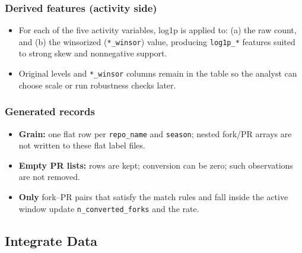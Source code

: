 \subsubsection{Derived features (activity side)}

\begin{itemize}
  \item For each of the five activity variables, log1p is applied to: (a) the raw count, and (b) the winsorized (\texttt{*\_winsor}) value, producing \texttt{log1p\_*} features suited to strong skew and nonnegative support.
  \item Original levels and \texttt{*\_winsor} columns remain in the table so the analyst can choose scale or run robustness checks later.
\end{itemize}

\subsubsection{Generated records}

\begin{itemize}
  \item \textbf{Grain:} one flat row per \texttt{repo\_name} and \texttt{season}; nested fork/PR arrays are not written to these flat label files.
  \item \textbf{Empty PR lists:} rows are kept; conversion can be zero; such observations are not removed.
  \item \textbf{Only} fork--PR pairs that satisfy the match rules and fall inside the active window update \texttt{n\_converted\_forks} and the rate.
\end{itemize}

\subsection{Integrate Data}

